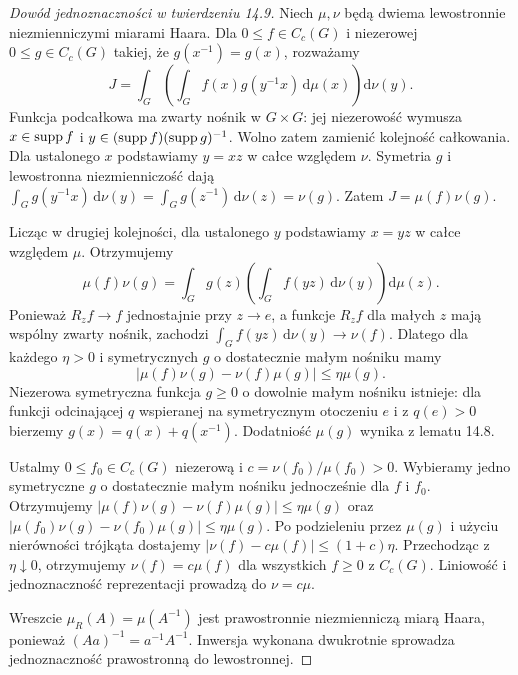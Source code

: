 \begin{proof}[Dowód jednoznaczności w twierdzeniu 14.9]
Niech $\mu,\nu$ będą dwiema lewostronnie niezmienniczymi miarami Haara. Dla $0\le f\in C_c(G)$ i niezerowej $0\le g\in C_c(G)$ takiej, że $g(x^{-1})=g(x)$, rozważamy
\[
J=\int_G\left(\int_G f(x)g(y^{-1}x)\,\mathrm d\mu(x)\right)\mathrm d\nu(y).
\]
Funkcja podcałkowa ma zwarty nośnik w $G\times G$: jej niezerowość wymusza $x\in\operatorname{supp} f$ i $y\in(\operatorname{supp} f)(\operatorname{supp} g)^{-1}$. Wolno zatem zamienić kolejność całkowania. Dla ustalonego $x$ podstawiamy $y=xz$ w całce względem $\nu$. Symetria $g$ i lewostronna niezmienniczość dają
$\int_G g(y^{-1}x)\,\mathrm d\nu(y)=\int_Gg(z^{-1})\,\mathrm d\nu(z)=\nu(g)$.
Zatem $J=\mu(f)\nu(g)$.

Licząc w drugiej kolejności, dla ustalonego $y$ podstawiamy $x=yz$ w całce względem $\mu$. Otrzymujemy
\[
\mu(f)\nu(g)=\int_Gg(z)\left(\int_Gf(yz)\,\mathrm d\nu(y)\right)\mathrm d\mu(z).
\]
Ponieważ $R_zf\to f$ jednostajnie przy $z\to e$, a funkcje $R_zf$ dla małych $z$ mają wspólny zwarty nośnik, zachodzi $\int_Gf(yz)\,\mathrm d\nu(y)\to\nu(f)$. Dlatego dla każdego $\eta>0$ i symetrycznych $g$ o dostatecznie małym nośniku mamy
\[
|\mu(f)\nu(g)-\nu(f)\mu(g)|\le\eta\mu(g).
\]
Niezerowa symetryczna funkcja $g\ge0$ o dowolnie małym nośniku istnieje: dla funkcji odcinającej $q$ wspieranej na symetrycznym otoczeniu $e$ i z $q(e)>0$ bierzemy $g(x)=q(x)+q(x^{-1})$. Dodatniość $\mu(g)$ wynika z lematu 14.8.

Ustalmy $0\le f_0\in C_c(G)$ niezerową i $c=\nu(f_0)/\mu(f_0)>0$. Wybieramy jedno symetryczne $g$ o dostatecznie małym nośniku jednocześnie dla $f$ i $f_0$. Otrzymujemy
$|\mu(f)\nu(g)-\nu(f)\mu(g)|\le\eta\mu(g)$ oraz
$|\mu(f_0)\nu(g)-\nu(f_0)\mu(g)|\le\eta\mu(g)$.
Po podzieleniu przez $\mu(g)$ i użyciu nierówności trójkąta dostajemy $|\nu(f)-c\mu(f)|\le(1+c)\eta$. Przechodząc z $\eta\downarrow0$, otrzymujemy $\nu(f)=c\mu(f)$ dla wszystkich $f\ge0$ z $C_c(G)$. Liniowość i jednoznaczność reprezentacji prowadzą do $\nu=c\mu$.

Wreszcie $\mu_R(A)=\mu(A^{-1})$ jest prawostronnie niezmienniczą miarą Haara, ponieważ $(Aa)^{-1}=a^{-1}A^{-1}$. Inwersja wykonana dwukrotnie sprowadza jednoznaczność prawostronną do lewostronnej.
\end{proof}

